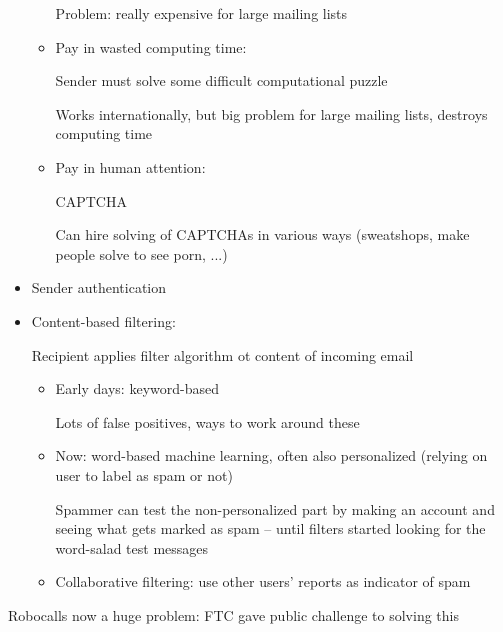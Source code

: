 \begin{itemize}
\begin{itemize}
                Problem: really expensive for large mailing lists
            \item Pay in wasted computing time:

                Sender must solve some difficult computational puzzle

                Works internationally, but big problem for large mailing lists,
                destroys computing time
            \item Pay in human attention:

                CAPTCHA %

                Can hire solving of CAPTCHAs in various ways (sweatshops, make
                    people solve to see porn, ...)
        \end{itemize}
    \item Sender authentication
    \item Content-based filtering:

        Recipient applies filter algorithm ot content of incoming email
        \begin{itemize}
            \item Early days: keyword-based

                Lots of false positives, ways to work around these
            \item Now: word-based machine learning, often also personalized
                (relying on user to label as spam or not)

                Spammer can test the non-personalized part by making an account
                and seeing what gets marked as spam -- until filters started
                looking for the word-salad test messages
            \item Collaborative filtering: use other users' reports as indicator
                of spam
        \end{itemize}
\end{itemize}

Robocalls now a huge problem: FTC gave public challenge to solving this
